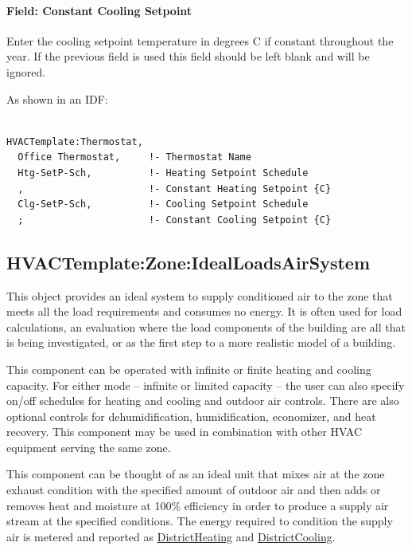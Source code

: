 \paragraph{Field: Constant Cooling Setpoint}\label{field-constant-cooling-setpoint}

Enter the cooling setpoint temperature in degrees C if constant throughout the year. If the previous field is used this field should be left blank and will be ignored.

As shown in an IDF:

\begin{lstlisting}

HVACTemplate:Thermostat,
  Office Thermostat,     !- Thermostat Name
  Htg-SetP-Sch,          !- Heating Setpoint Schedule
  ,                      !- Constant Heating Setpoint {C}
  Clg-SetP-Sch,          !- Cooling Setpoint Schedule
  ;                      !- Constant Cooling Setpoint {C}
\end{lstlisting}

\subsection{HVACTemplate:Zone:IdealLoadsAirSystem}\label{hvactemplatezoneidealloadsairsystem}

This object provides an ideal system to supply conditioned air to the zone that meets all the load requirements and consumes no energy. It is often used for load calculations, an evaluation where the load components of the building are all that is being investigated, or as the first step to a more realistic model of a building.

This component can be operated with infinite or finite heating and cooling capacity. For either mode -- infinite or limited capacity -- the user can also specify on/off schedules for heating and cooling and outdoor air controls. There are also optional controls for dehumidification, humidification, economizer, and heat recovery. This component may be used in combination with other HVAC equipment serving the same zone.

This component can be thought of as an ideal unit that mixes air at the zone exhaust condition with the specified amount of outdoor air and then adds or removes heat and moisture at 100\% efficiency in order to produce a supply air stream at the specified conditions. The energy required to condition the supply air is metered and reported as \hyperref[districtheating]{DistrictHeating} and \hyperref[districtcooling]{DistrictCooling}.

